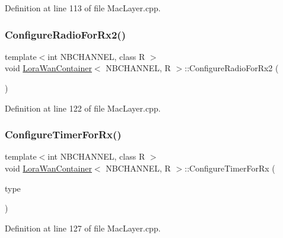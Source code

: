 Definition at line 113 of file Mac\+Layer.\+cpp.

\mbox{\label{class_lora_wan_container_a9f189640ccae4f4b1e11c4671c88b6c0}} 
\subsubsection{\texorpdfstring{Configure\+Radio\+For\+Rx2()}{ConfigureRadioForRx2()}}
{\footnotesize\ttfamily template$<$int N\+B\+C\+H\+A\+N\+N\+EL, class R $>$ \\
void \mbox{\hyperlink{class_lora_wan_container}{Lora\+Wan\+Container}}$<$ N\+B\+C\+H\+A\+N\+N\+EL, R $>$\+::Configure\+Radio\+For\+Rx2 (\begin{DoxyParamCaption}\item[{void}]{ }\end{DoxyParamCaption})}



Definition at line 122 of file Mac\+Layer.\+cpp.

\mbox{\label{class_lora_wan_container_a077db278808a15326893610820e26b22}} 
\subsubsection{\texorpdfstring{Configure\+Timer\+For\+Rx()}{ConfigureTimerForRx()}}
{\footnotesize\ttfamily template$<$int N\+B\+C\+H\+A\+N\+N\+EL, class R $>$ \\
void \mbox{\hyperlink{class_lora_wan_container}{Lora\+Wan\+Container}}$<$ N\+B\+C\+H\+A\+N\+N\+EL, R $>$\+::Configure\+Timer\+For\+Rx (\begin{DoxyParamCaption}\item[{\mbox{\hyperlink{_define_8h_ab894a4c21b8aae9e9c68d8c426a66956}{e\+Rx\+Win\+Type}}}]{type }\end{DoxyParamCaption})}



Definition at line 127 of file Mac\+Layer.\+cpp.

